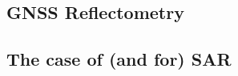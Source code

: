  {\small\textit{\lipsum[1-2]}}

\subsection{GNSS Reflectometry}
\label{subsec:GNSS_Reflectometry}

 {\small\textit{\lipsum[1-2]}}

\subsection{The case of (and for) SAR}
\label{subsec:SAR}

 {\small\textit{\lipsum[1-2]}}


